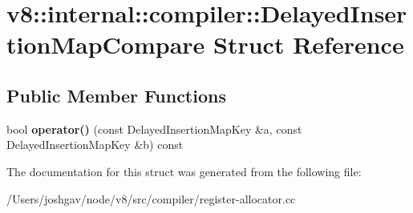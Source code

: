 \hypertarget{structv8_1_1internal_1_1compiler_1_1_delayed_insertion_map_compare}{}\section{v8\+:\+:internal\+:\+:compiler\+:\+:Delayed\+Insertion\+Map\+Compare Struct Reference}
\label{structv8_1_1internal_1_1compiler_1_1_delayed_insertion_map_compare}
\subsection*{Public Member Functions}
\begin{DoxyCompactItemize}
\item 
bool {\bfseries operator()} (const Delayed\+Insertion\+Map\+Key \&a, const Delayed\+Insertion\+Map\+Key \&b) const \hypertarget{structv8_1_1internal_1_1compiler_1_1_delayed_insertion_map_compare_a7b96e69364ba0106c98dfedfa4db50f2}{}\label{structv8_1_1internal_1_1compiler_1_1_delayed_insertion_map_compare_a7b96e69364ba0106c98dfedfa4db50f2}

\end{DoxyCompactItemize}


The documentation for this struct was generated from the following file\+:\begin{DoxyCompactItemize}
\item 
/\+Users/joshgav/node/v8/src/compiler/register-\/allocator.\+cc\end{DoxyCompactItemize}
